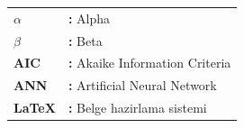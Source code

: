 \begin{tabular}{@{}p{3cm}l@{}}
\textbf{$\alpha$} & \textbf{:} Alpha \\
\textbf{$\beta$} & \textbf{:} Beta \\
\textbf{AIC} & \textbf{:} Akaike Information Criteria \\
\textbf{ANN} & \textbf{:} Artificial Neural Network \\
\textbf{LaTeX} & \textbf{:} Belge hazirlama sistemi \\
\end{tabular}
